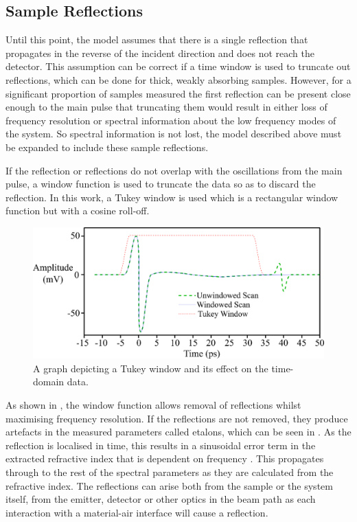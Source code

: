 \subsection{Sample Reflections}
\label{subsec:Reflections}
Until this point, the model assumes that there is a single reflection that propagates in the reverse of the incident direction and does not reach the detector. This assumption can be correct if a time window is used to truncate out reflections, which can be done for thick, weakly absorbing samples. However, for a significant proportion of samples measured the first reflection can be present close enough to the main pulse that truncating them would result in either loss of frequency resolution or spectral information about the low frequency modes of the system. So spectral information is not lost, the model described above must be expanded to include these sample reflections.

If the reflection or reflections do not overlap with the oscillations from the main pulse, a window function is used to truncate the data so as to discard the reflection.  In this work, a Tukey window is used which is a rectangular window function but with a cosine roll-off.

\begin{figure}
    \centering
    \includegraphics{Figures/Misc/Theory/Window.png}
    \captionsetup{font = footnotesize, justification = centering}
    \caption[A Graph depicting a Tukey Window and its Effect on the Time-Domain Data]{A graph depicting a Tukey window and its effect on the time-domain data.}
    \label{fig:window}
\end{figure}

As shown in , the window function allows removal of reflections whilst maximising frequency resolution. If the reflections are not removed, they produce artefacts in the measured parameters called etalons, which can be seen in . As the reflection is localised in time, this results in a sinusoidal error term in the extracted refractive index that is dependent on frequency \cite{Greenall2017}. This propagates through to the rest of the spectral parameters as they are calculated from the refractive index.
The reflections can arise both from the sample or the system itself, from the emitter, detector or other optics in the beam path as each interaction with a material-air interface will cause a reflection.

